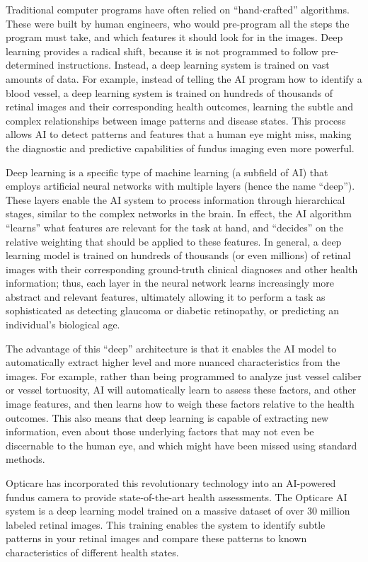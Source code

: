 \documentclass[
  Letterpaper,
]{scrbook}
\begin{document}
Traditional computer programs have often relied on ``hand-crafted''
algorithms. These were built by human engineers, who would pre-program
all the steps the program must take, and which features it should look
for in the images. Deep learning provides a radical shift, because it is
not programmed to follow pre-determined instructions. Instead, a deep
learning system is trained on vast amounts of data. For example, instead
of telling the AI program how to identify a blood vessel, a deep
learning system is trained on hundreds of thousands of retinal images
and their corresponding health outcomes, learning the subtle and complex
relationships between image patterns and disease states. This process
allows AI to detect patterns and features that a human eye might miss,
making the diagnostic and predictive capabilities of fundus imaging even
more powerful.

Deep learning is a specific type of machine learning (a subfield of AI)
that employs artificial neural networks with multiple layers (hence the
name ``deep''). These layers enable the AI system to process information
through hierarchical stages, similar to the complex networks in the
brain. In effect, the AI algorithm ``learns'' what features are relevant
for the task at hand, and ``decides'' on the relative weighting that
should be applied to these features. In general, a deep learning model
is trained on hundreds of thousands (or even millions) of retinal images
with their corresponding ground-truth clinical diagnoses and other
health information; thus, each layer in the neural network learns
increasingly more abstract and relevant features, ultimately allowing it
to perform a task as sophisticated as detecting glaucoma or diabetic
retinopathy, or predicting an individual's biological age.

The advantage of this ``deep'' architecture is that it enables the AI
model to automatically extract higher level and more nuanced
characteristics from the images. For example, rather than being
programmed to analyze just vessel caliber or vessel tortuosity, AI will
automatically learn to assess these factors, and other image features,
and then learns how to weigh these factors relative to the health
outcomes. This also means that deep learning is capable of extracting
new information, even about those underlying factors that may not even
be discernable to the human eye, and which might have been missed using
standard methods.

Opticare has incorporated this revolutionary technology into an
AI-powered fundus camera to provide state-of-the-art health assessments.
The Opticare AI system is a deep learning model trained on a massive
dataset of over 30 million labeled retinal images. This training enables
the system to identify subtle patterns in your retinal images and
compare these patterns to known characteristics of different health
states.
\end{document}

